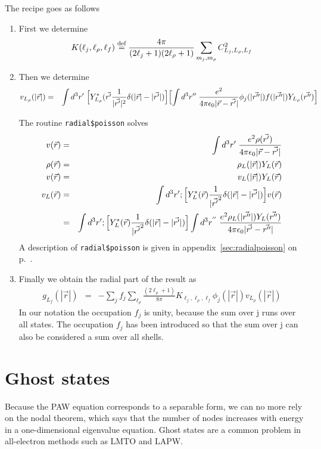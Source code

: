 \documentclass[11pt,a4paper]{report}
\begin{document}
The recipe goes as follows 
\begin{enumerate}
\item First we determine
\begin{eqnarray*}
K(\ell_j,\ell_\rho,\ell_f)\stackrel{\text{def}}{=}
\frac{4\pi}{(2\ell_j+1)(2\ell_\rho+1)}\sum_{m_j,m_\rho}C_{L_j,L_\rho,L_f}^2
\end{eqnarray*}

\item Then we determine
\begin{eqnarray*}
v_{L_\rho}(|\vec{r}|)&=&
\int d^3r'\;\Bigl[Y^*_{L_\rho}(\vec{r'}\frac{1}{|\vec{r'}|^2}\delta(|\vec{r}|-|\vec{r'}|)\Bigr]
\Bigl[\int d^3r''\; \frac{e^2}
{4\pi\epsilon_0|\vec{r}-\vec{r'}|}
\phi_j(|\vec{r''}|)f(|\vec{r''}|)Y_{L_\rho}(\vec{r''})\Bigr]
\end{eqnarray*}

The routine \verb|radial$poisson| solves
\begin{eqnarray*}
v(\vec{r})&=&\int d^3r'\;\frac{e^2\rho(\vec{r'})}{4\pi\epsilon_0|\vec{r}-\vec{r'}|}
\\
\rho(\vec{r})&=&\rho_L(|\vec{r}|)Y_L(\vec{r})
\\
v(\vec{r})&=&v_L(|\vec{r}|)Y_L(\vec{r})
\\
v_L(\vec{r})
&=&\int d^3r'; \Bigl[Y^*_L(\vec{r})\frac{1}{|\vec{r'}^2}
\delta(|\vec{r}|-|\vec{r'}|)\Bigr]
v(\vec{r})
\\
&=&\int d^3r'; \Bigl[Y^*_L(\vec{r})\frac{1}{|\vec{r'}^2}
\delta(|\vec{r}|-|\vec{r'}|)\Bigr]
\int d^3r^{''}\;\frac{e^2\rho_L(|\vec{r''}|)Y_L(\vec{r''})}{4\pi\epsilon_0|\vec{r'}-\vec{r''}|}
\end{eqnarray*}
A description of \verb|radial$poisson| is given in
appendix~\ref{sec:radialpoisson} on p.~\pageref{sec:radialpoisson}.


\item Finally we obtain the radial part of the result as
\begin{eqnarray*}
g_{L_f}(|\vec{r}|)&=&-\sum_{j}f_j\sum_{\ell_\rho}
\frac{(2\ell_\rho+1)}{8\pi}K_{\ell_j,\ell_\rho,\ell_f}
\phi_j(|\vec{r}|)v_{L_\rho}(|\vec{r}|)
\end{eqnarray*}
In our notation the
occupation $f_j$ is unity, because the sum over j runs over all
states.  The occupation $f_j$ has been introduced so that the sum over
j can also be considered a sum over all shells.
\end{enumerate}

\section{Ghost states}
Because the PAW equation corresponds to a separable form, we can no
more rely on the nodal theorem, which says that the number of nodes
increases with energy in a one-dimensional eigenvalue equation. Ghost
states are a common problem in all-electron methods such as LMTO and
LAPW.
\end{document}
